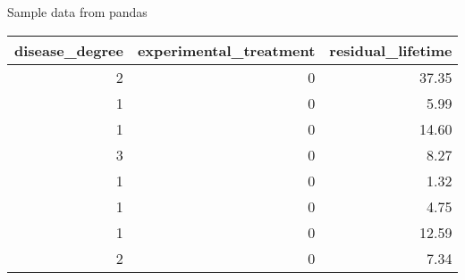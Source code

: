\caption{Sample data from pandas}
\label{tab:sample_data}
\begin{tabular}{rrr}
\toprule
disease\_degree & experimental\_treatment & residual\_lifetime \\
\midrule
2 & 0 & 37.35 \\
1 & 0 & 5.99 \\
1 & 0 & 14.60 \\
3 & 0 & 8.27 \\
1 & 0 & 1.32 \\
1 & 0 & 4.75 \\
1 & 0 & 12.59 \\
2 & 0 & 7.34 \\
\bottomrule
\end{tabular}
